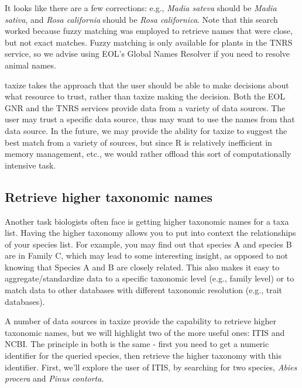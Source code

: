 \documentclass[letterpaper,superscriptaddress,showkeys,longbibliography,10pt]{revtex4-1}\usepackage{graphicx, color}
\begin{document}
It looks like there are a few corrections: e.g., \emph{Madia sateva} should be \emph{Madia sativa}, and \emph{Rosa california} should be \emph{Rosa californica}. Note that this search worked because fuzzy matching was employed to retrieve names that were close, but not exact matches. Fuzzy matching is only available for plants in the TNRS service, so we advise using EOL's Global Names Resolver if you need to resolve animal names.

taxize takes the approach that the user should be able to make decisions about what resource to trust, rather than taxize making the decision. Both the EOL GNR and the TNRS services provide data from a variety of data sources. The user may trust a specific data source, thus may want to use the names from that data source. In the future, we may provide the ability for taxize to suggest the best match from a variety of sources, but since R is relatively inefficient in memory management, etc., we would rather offload this sort of computationally intensive task.

\subsection{Retrieve higher taxonomic names}

Another task biologists often face is getting higher taxonomic names for a taxa list. Having the higher taxonomy allows you to put into context the relationships of your species list. For example, you may find out that species A and species B are in Family C, which may lead to some interesting insight, as opposed to not knowing that Species A and B are closely related. This also makes it easy to aggregate/standardize data to a specific taxonomic level (e.g., family level) or to match data to other databases with different taxonomic resolution (e.g., trait databases).

A number of data sources in taxize provide the capability to retrieve higher taxonomic names, but we will highlight two of the more useful ones: ITIS and NCBI. The principle in both is the same - first you need to get a numeric identifier for the queried species, then retrieve the higher taxonomy with this identifier. First, we'll explore the user of ITIS, by searching for two species, \emph{Abies procera} and \emph{Pinus contorta}.
\end{document}
